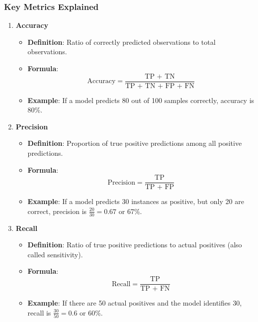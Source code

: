 \documentclass[aspectratio=169]{beamer}
\begin{document}
\begin{frame}
    \frametitle{Key Metrics Explained}
    \begin{enumerate}
        \item \textbf{Accuracy}
            \begin{itemize}
                \item \textbf{Definition}: Ratio of correctly predicted observations to total observations.
                \item \textbf{Formula}:  
                \[
                \text{Accuracy} = \frac{\text{TP + TN}}{\text{TP + TN + FP + FN}}
                \]
                \item \textbf{Example}: If a model predicts 80 out of 100 samples correctly, accuracy is 80\%.
            \end{itemize}
    
        \item \textbf{Precision}
            \begin{itemize}
                \item \textbf{Definition}: Proportion of true positive predictions among all positive predictions.
                \item \textbf{Formula}:  
                \[
                \text{Precision} = \frac{\text{TP}}{\text{TP + FP}}
                \]
                \item \textbf{Example}: If a model predicts 30 instances as positive, but only 20 are correct, precision is \( \frac{20}{30} = 0.67 \) or 67\%.
            \end{itemize}
    
        \item \textbf{Recall}
            \begin{itemize}
                \item \textbf{Definition}: Ratio of true positive predictions to actual positives (also called sensitivity).
                \item \textbf{Formula}:  
                \[
                \text{Recall} = \frac{\text{TP}}{\text{TP + FN}}
                \]
                \item \textbf{Example}: If there are 50 actual positives and the model identifies 30, recall is \( \frac{30}{50} = 0.6 \) or 60\%.
            \end{itemize}
    \end{enumerate}
\end{frame}
\end{document}
